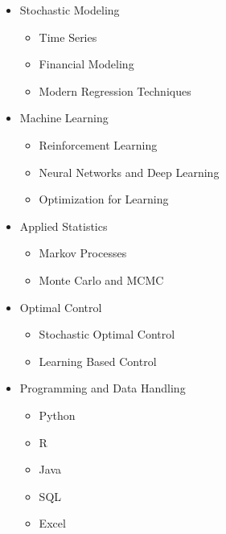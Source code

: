 \documentclass[10pt, a4paper, english]{article}
\begin{document}
\begin{paracol}{2}
\begin{itemize}[leftmargin =\widthof{~$\bullet$~}]
\setlength\itemsep{0.1em}
\item Stochastic Modeling
	\begin{itemize}[leftmargin =\widthof{~$\bullet$~}]\footnotesize\vspace{-0.3em}
	\setlength\itemsep{0.1em}
	\item Time Series
	\item Financial Modeling
	\item Modern Regression Techniques
	\end{itemize}
\item Machine Learning
	\begin{itemize}[leftmargin =\widthof{~$\bullet$~}]\footnotesize\vspace{-0.3em}
	\setlength\itemsep{0.1em}
	\item Reinforcement Learning
	\item Neural Networks and Deep Learning
	\item Optimization for Learning
	\end{itemize}
\item Applied Statistics
	\begin{itemize}[leftmargin =\widthof{~$\bullet$~}]\footnotesize\vspace{-0.3em}
	\setlength\itemsep{0.1em}
	\item Markov Processes
	\item Monte Carlo and MCMC
	\end{itemize}
\item Optimal Control
	\begin{itemize}[leftmargin =\widthof{~$\bullet$~}]\footnotesize\vspace{-0.3em}
	\setlength\itemsep{0.1em}
	\item Stochastic Optimal Control
	\item Learning Based Control
	\end{itemize}
\item Programming and Data Handling
	\begin{itemize}[leftmargin =\widthof{~$\bullet$~}]\footnotesize\vspace{-0.3em}
	\setlength\itemsep{0.1em}
	\item[{\makebox[.15cm]{\faPython}}] Python
	\item[{\makebox[.15cm]{\faRProject}}] R
	\item[{\makebox[.15cm]{\faJava}}] Java
	\item[{\makebox[.15cm]{\faDatabase}}] SQL
	\item[{\makebox[.15cm]{\faFileExcel}}] Excel
	\end{itemize}
\end{itemize}


\end{paracol}
\end{document}
